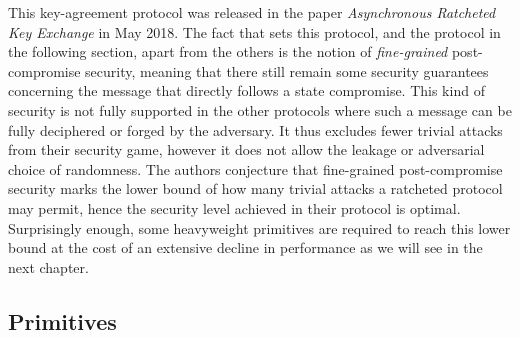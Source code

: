 \documentclass[11pt,a4paper,twoside,openright,bibliography=totoc]{scrbook}
\begin{document}
This key-agreement protocol was released in the paper
\textit{Asynchronous Ratcheted Key Exchange} in May 2018.
The fact that sets this protocol, and the protocol in the following
section, apart from the others is the notion of \textit{fine-grained}
post-compromise security, meaning that there still remain some
security guarantees concerning the message that directly follows a
state compromise. This kind of security is not fully supported in
the other protocols where such a message can be fully deciphered
or forged by the adversary. It thus excludes fewer trivial attacks
from their security game, however it does not allow the leakage
or adversarial choice of randomness. The authors conjecture that
fine-grained post-compromise security marks the lower bound
of how many trivial attacks a ratcheted protocol may permit, hence
the security level achieved in their protocol is optimal.
Surprisingly enough, some heavyweight primitives are required
to reach this lower bound at the cost of an extensive decline
in performance as we will see in the next chapter.

\subsection{Primitives}
\label{sec:primitives}
\end{document}
